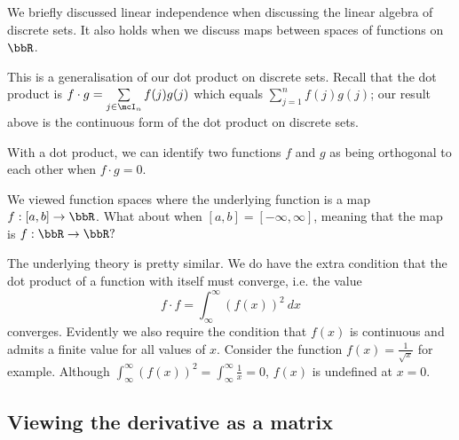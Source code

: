 \documentclass[a4paper, 12pt,oneside,openany]{book}
\begin{document}
We briefly discussed linear independence when discussing the linear algebra of discrete sets. It also holds when we discuss maps between spaces of functions on $\bbR$. 


This is a generalisation of our dot product on discrete sets. Recall that the dot product is $f \cdot g = \sum\limits_{j \in \mcI_n} f(j) g(j)$ which equals $\sum\limits_{j=1}^n f(j)g(j)$; our result above is the continuous form of the dot product on discrete sets.

With a dot product, we can identify two functions $f$ and $g$ as being orthogonal to each other when $f \cdot g=0$. 




We viewed function spaces where the underlying function is a map $f: [a, b] \to \bbR$. What about when $[a, b] = [-\infty, \infty]$, meaning that the map is $f: \bbR\to\bbR?$

The underlying theory is pretty similar. We do have the extra condition that the dot product of a function with itself must converge, i.e. the value $$f \cdot f = \int_{\infty}^\infty (f(x))^2\ dx$$ converges. Evidently we also require the condition that $f(x)$ is continuous and admits a finite value for all values of $x$. Consider the function $f(x) = \frac{1}{\sqrt{x}}$ for example. Although $\int_{\infty}^\infty (f(x))^2= \int_{\infty}^\infty \frac{1}{x}=0$, $f(x)$ is undefined at $x=0$.

\subsection{Viewing the derivative as a matrix}
\end{document}

